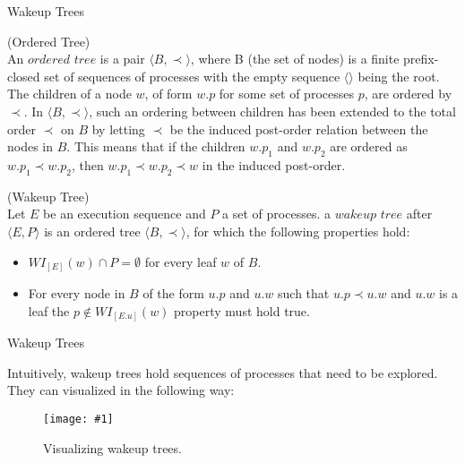 \documentclass[9pt]{beamer}
\newcommand{\tracelonglong}[2]{
\begin{figure}[H]
\centering
\texttt{[image: \#1]}
\caption{#2}
\label{#2}
\end{figure}
}
\begin{document}
\begin{frame} {Wakeup Trees}


\begin{definition}{(Ordered Tree)}\label{def:Ordered}\\
An $ordered$ $tree$ is a pair $\langle B , \prec \rangle$, where B (the set of nodes) is a finite prefix-closed
    set of sequences of processes with the empty sequence $\langle\rangle$ being the root.
    The children of a node $w$, of form $w.p$ for some set of processes $p$, are ordered by $\prec$. 
    In $\langle B , \prec \rangle$, such an ordering between children has been extended to the total 
    order $\prec$ on $B$ by letting $\prec$ be the induced post-order relation between the nodes in $B$.
    This means that if the children $w.p_1$ and $w.p_2$ are ordered as $w.p_1 \prec w.p_2$,
    then $w.p_1 \prec w.p_2 \prec w $ in the induced post-order.
\end{definition}

\begin{definition}{(Wakeup Tree)}\\
    Let $E$ be an execution sequence and $P$ a set of processes. a $wakeup$ $tree$ after $\langle E , P \rangle$
    is an ordered tree $\langle B , \prec \rangle$, for which the following properties hold:
    \begin{itemize}
        \item $WI_{[E]}(w) \cap P = \emptyset$ for every leaf $w$ of $B$.
        \item For every node in $B$ of the form $u.p$ and $u.w$ such that $u.p \prec u.w$ and $u.w$ is a leaf
        the $p \not \in WI_{[E.u]}(w)$ property must hold true.
    \end{itemize}
\end{definition}

\end{frame}


\begin{frame} {Wakeup Trees}

Intuitively, wakeup trees hold sequences of processes that
need to be explored. They can visualized in the following way:

\pause

\tracelonglong{WuTExample.png}{Visualizing wakeup trees.}

\end{frame}
\end{document}
